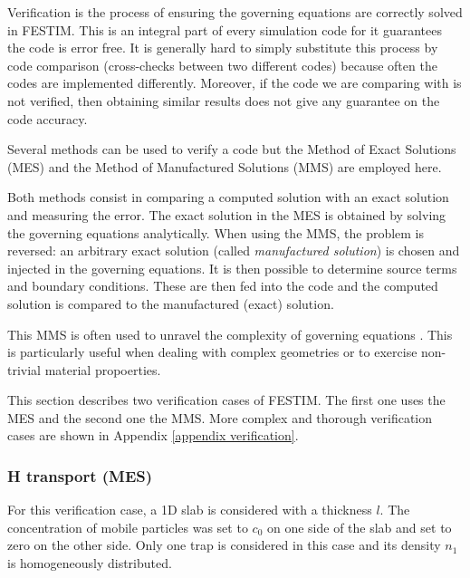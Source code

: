 Verification is the process of ensuring the governing equations are correctly solved in FESTIM.
This is an integral part of every simulation code for it guarantees the code is error free.
It is generally hard to simply substitute this process by code comparison (cross-checks between two different codes) because often the codes are implemented differently.
Moreover, if the code we are comparing with is not verified, then obtaining similar results does not give any guarantee on the code accuracy.

Several methods can be used to verify a code but the Method of Exact Solutions (MES) and the Method of Manufactured Solutions (MMS) are employed here.

Both methods consist in comparing a computed solution with an exact solution and measuring the error.
The exact solution in the MES is obtained by solving the governing equations analytically.
When using the MMS, the problem is reversed: an arbitrary exact solution (called \textit{manufactured solution}) is chosen and injected in the governing equations.
It is then possible to determine source terms and boundary conditions.
These are then fed into the code and the computed solution is compared to the manufactured (exact) solution.

This MMS is often used to unravel the complexity of governing equations .
This is particularly useful when dealing with complex geometries or to exercise non-trivial material propoerties.

This section describes two verification cases of FESTIM.
The first one uses the MES and the second one the MMS.
More complex and thorough verification cases are shown in Appendix \ref{appendix verification}.

\subsubsection{H transport (MES)} \label{analytical}


For this verification case, a 1D slab is considered with a thickness $l$.
The concentration of mobile particles was set to $c_0$ on one side of the slab and set to zero on the other side.
Only one trap is considered in this case and its density $n_1$ is homogeneously distributed.

